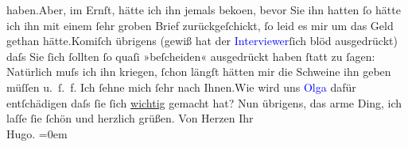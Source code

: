                   haben.\hspace*{1.5em}Aber, im Ernſt, hätte ich ihn jemals
                  beko{\geminationm}en, bevor Sie ihn hatten ſo hätte ich ihn mit
               einem ſehr groben Brief zurückgeſchickt, ſo leid es mir um das Geld gethan
                  hätte.\hspace*{1.5em}Komiſch übrigens (gewiß hat {\pb}der \textcolor{blue}{Interviewer}{}ſich blöd ausgedrückt) daſs Sie ſich ſollten ſo
               quaſi »beſcheiden« ausgedrückt haben ſtatt zu ſagen: Natürlich muſs ich ihn kriegen,
               ſchon längſt hätten mir die Schweine ihn geben müſſen u. ſ. f.\pend
           \pstart
           Ich ſehne mich ſehr {\pb}nach
                  Ihnen.\hspace*{1.5em}Wie wird uns \textcolor{blue}{Olga}{}\ledrightnote{\textcolor{blue}{Olga Schnitzler}} dafür entſchädigen daſs ſie ſich \uline{wichtig} gemacht hat? Nun übrigens, das arme Ding, ich laſſe ſie ſchön und
               herzlich grüßen.\pend
           \pstart
           Von Herzen Ihr{\\[\baselineskip]}\spacefill\mbox{Hugo.}\pend
           \leftskip=0em{}\endnumbering{}  
      